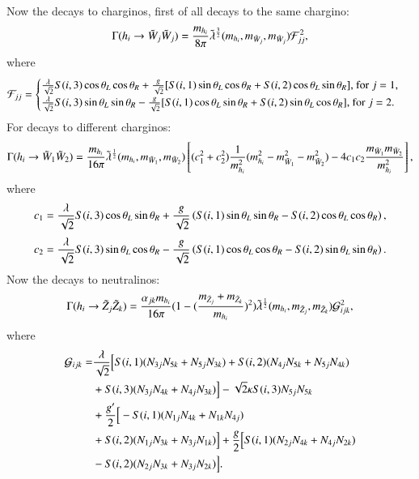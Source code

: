 \documentclass[final,3p,times,pdflatex]{elsarticle}
\begin{document}
Now the decays to charginos, first of all decays to the same chargino:
\begin{equation} \label{hchchNMSSM}
\Gamma( h_{i} \rightarrow \tilde{W}_j \tilde{W}_j) = {m_{h_i} \over 8\pi} \tilde{\lambda}^{3 \over 2}(m_{h_i},m_{\tilde{W}_j},m_{\tilde{W}_j})\mathcal{F}_{jj}^2,
\end{equation}
where
\begin{equation}
\mathcal{F}_{jj} = \begin{cases}
					{\lambda \over \sqrt{2}}S(i,3)\cos\theta_L \cos\theta_R + {g \over \sqrt{2}}[S(i,1)\sin\theta_L \cos\theta_R + S(i,2)\cos\theta_L \sin\theta_R] $, for $j=1$, $ \\
					{\lambda \over \sqrt{2}}S(i,3)\sin\theta_L \sin\theta_R - {g \over \sqrt{2}}[S(i,1)\cos\theta_L \sin\theta_R + S(i,2)\sin\theta_L \cos\theta_R] $, for $j=2$. $ \\
					\end{cases}
\end{equation}
For decays to different charginos:
\begin{equation} \label{hch1ch2NMSSM}
\Gamma( h_{i} \rightarrow \tilde{W}_1 \tilde{W}_2) = {m_{h_i} \over 16\pi} \tilde{\lambda}^{1 \over 2}(m_{h_i},m_{\tilde{W}_1},m_{\tilde{W}_2})\left[(c_{1}^2 + c_{2}^2){1 \over m_{h_i}^2}(m_{h_i}^2- m_{\tilde{W}_1}^2 - m_{\tilde{W}_2}^2) - 4c_{1}c_{2}{m_{\tilde{W}_1}m_{\tilde{W}_2} \over m_{h_i}^2}\right] ,
\end{equation}
where
\begin{equation}
c_{1} = {\lambda \over \sqrt{2}}S(i,3)\cos\theta_L \sin\theta_R + {g \over \sqrt{2}}\left(S(i,1)\sin\theta_L \sin\theta_R - S(i,2)\cos\theta_L \cos\theta_R\right),
\end{equation}
\begin{equation}
c_{2} = {\lambda \over \sqrt{2}}S(i,3)\sin\theta_L \cos\theta_R - {g \over \sqrt{2}}\left(S(i,1)\cos\theta_L \cos\theta_R - S(i,2)\sin\theta_L \sin\theta_R\right).
\end{equation}
Now the decays to neutralinos:
\begin{equation} \label{hneutneutNMSSM}
\Gamma(h_{i} \rightarrow \tilde{Z}_j \tilde{Z}_k) = {\alpha_{jk} m_{h_i} \over 16 \pi} (1 - ({m_{\tilde{Z}_j} + m_{\tilde{Z}_k} \over m_{h_i}})^2) \tilde{\lambda}^{1 \over 2}(m_{h_i},m_{\tilde{Z}_j},m_{\tilde{Z}_k}) \mathcal{G}_{ijk}^2,
\end{equation}
where
\begin{equation}
\begin{aligned}
\mathcal{G}_{ijk} = & {\lambda \over \sqrt{2}}\Big[S(i,1)(N_{3j}N_{5k} + N_{5j}N_{3k}) + S(i,2)(N_{4j}N_{5k} + N_{5j}N_{4k}) \\ & + S(i,3)(N_{3j}N_{4k} + N_{4j}N_{3k})\Big]  - \sqrt{2}\kappa S(i,3)N_{5j}N_{5k} \\ & + {g' \over 2}\Big[-S(i,1)(N_{1j}N_{4k} + N_{1k}N_{4j}) \\ & + S(i,2)(N_{1j}N_{3k}+N_{3j}N_{1k})\Big] + {g \over 2}\Big[S(i,1)(N_{2j}N_{4k} + N_{4j}N_{2k}) \\ & - S(i,2)(N_{2j}N_{3k}+N_{3j}N_{2k})\Big].
\end{aligned}
\end{equation}
\end{document}
